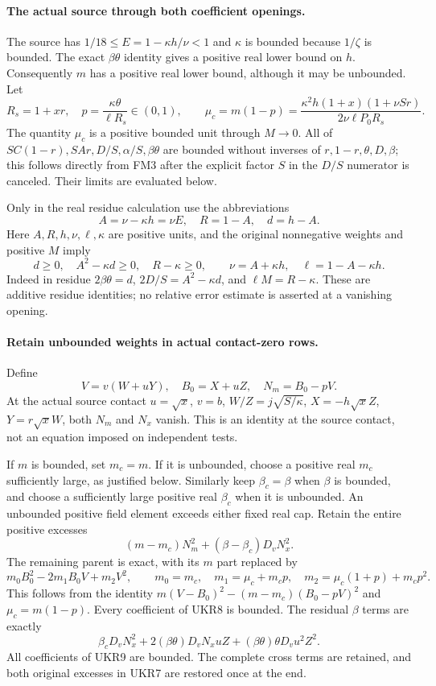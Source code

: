 \paragraph{The actual source through both coefficient openings.}
The source has $1/18\le E=1-\kappa h/\nu<1$ and
$\kappa$ is bounded because $1/\zeta$ is bounded. The exact
$\beta\theta$ identity gives a positive real lower bound on $h$.
Consequently $m$ has a positive real lower bound, although it may
be unbounded. Let
\[
 R_s=1+xr,\quad p=\frac{\kappa\theta}{\ell R_s}\in(0,1),\qquad
 \mu_c=m(1-p)=
 \frac{\kappa^2h(1+x)(1+\nu Sr)}{2\nu\ell P_0R_s}.
 \tag{UKR3}
\]
The quantity $\mu_c$ is a positive bounded unit through $M\to0$.
All of $SC(1-r),SAr,D/S,\alpha/S,\beta\theta$ are bounded
without inverses of $r,1-r,\theta,D,\beta$; this follows directly
from FM3 after the explicit factor $S$ in the $D/S$ numerator
is canceled. Their limits are evaluated below.

Only in the real residue calculation use the abbreviations
\[
 A=\nu-\kappa h=\nu E,\quad R=1-A,\quad d=h-A.
 \tag{UKR4}
\]
Here $A,R,h,\nu,\ell,\kappa$ are positive units, and the
original nonnegative weights and positive $M$ imply
\[
 d\ge0,\quad A^2-\kappa d\ge0,\quad R-\kappa\ge0,
 \qquad \nu=A+\kappa h,\quad\ell=1-A-\kappa h.
 \tag{UKR5}
\]
Indeed in residue $2\beta\theta=d$, $2D/S=A^2-\kappa d$,
and $\ell M=R-\kappa$. These are additive residue identities;
no relative error estimate is asserted at a vanishing opening.

\paragraph{Retain unbounded weights in actual contact-zero rows.}
Define
\[
 V=v(W+uY),\quad B_0=X+uZ,\quad N_m=B_0-pV.
 \tag{UKR6}
\]
At the actual source contact $u=\sqrt x$, $v=b$,
$W/Z=j\sqrt{S/\kappa}$, $X=-h\sqrt x Z$, $Y=r\sqrt x W$,
both $N_m$ and $N_x$ vanish. This is an identity at the source
contact, not an equation imposed on independent tests.

If $m$ is bounded, set $m_c=m$. If it is unbounded, choose a
positive real $m_c$ sufficiently large, as justified below.
Similarly keep $\beta_c=\beta$ when $\beta$ is bounded, and
choose a sufficiently large positive real $\beta_c$ when it is
unbounded. An unbounded positive field element exceeds either
fixed real cap. Retain the entire positive excesses
\[
 (m-m_c)N_m^2+(\beta-\beta_c)D_vN_x^2.
 \tag{UKR7}
\]
The remaining parent is exact, with its $m$ part replaced by
\[
 m_0 B_0^2-2m_1B_0V+m_2V^2,\qquad
 m_0=m_c,\quad m_1=\mu_c+m_cp,\quad
 m_2=\mu_c(1+p)+m_cp^2.
 \tag{UKR8}
\]
This follows from the identity
$m(V-B_0)^2-(m-m_c)(B_0-pV)^2$
and $\mu_c=m(1-p)$. Every coefficient of UKR8 is bounded.
The residual $\beta$ terms are exactly
\[
 \beta_cD_vN_x^2+2(\beta\theta)D_vN_xuZ
                         +(\beta\theta)\theta D_vu^2Z^2.
 \tag{UKR9}
\]
All coefficients of UKR9 are bounded. The complete cross terms
are retained, and both original excesses in UKR7 are restored
once at the end.

